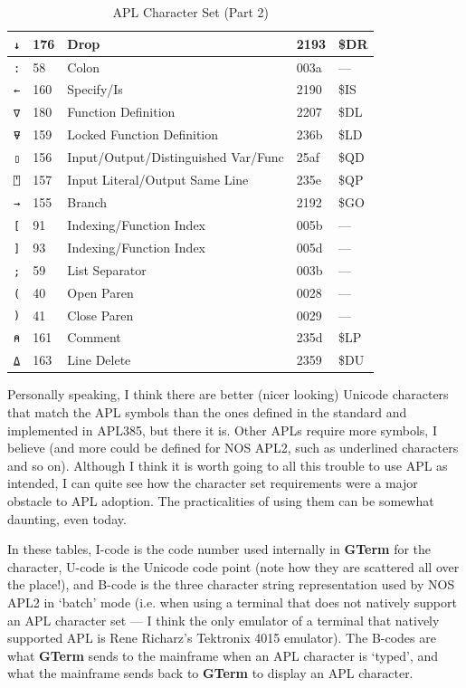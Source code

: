 \documentclass[a4paper,twoside,11pt]{article}
\newcommand{\newpara}{\par\vspace{4mm}\noindent}
\begin{document}
\begin{table}
\begin{tabular}{||l|l|l|l|l||}
\texttt{↓} & 176 & Drop & 2193 & \$DR\\\hline
\texttt{:} & 58 & Colon & 003a & ---\\\hline
\texttt{←} & 160 & Specify/Is & 2190 & \$IS\\\hline
\texttt{∇} & 180 & Function Definition & 2207 & \$DL\\\hline
\texttt{⍫} & 159 & Locked Function Definition & 236b & \$LD\\\hline
\texttt{▯} & 156 & Input/Output/Distinguished Var/Func & 25af & \$QD\\\hline
\texttt{⍞} & 157 & Input Literal/Output Same Line & 235e & \$QP\\\hline
\texttt{→} & 155 & Branch & 2192 & \$GO\\\hline
\texttt{{[}} & 91 & Indexing/Function Index & 005b & ---\\\hline
\texttt{{]}} & 93 & Indexing/Function Index & 005d & ---\\\hline
\texttt{;} & 59 & List Separator & 003b & ---\\\hline
\texttt{(} & 40 & Open Paren & 0028 & ---\\\hline
\texttt{)} & 41 & Close Paren & 0029 & ---\\\hline
\texttt{⍝} & 161 & Comment & 235d & \$LP\\\hline
\texttt{⍙} & 163 & Line Delete & 2359 & \$DU\\\hline
\hline\hline
\end{tabular}
\caption{APL Character Set (Part 2)}
\label{tab:aplcs2}
\end{table}

\newpara
Personally speaking, I think there are better (nicer looking) Unicode characters that match the APL symbols than the
ones defined in the standard and implemented in APL385, but there it is. Other APLs require more symbols, I
believe (and more could be defined for NOS APL2, such as underlined characters and so on). 
Although I think it is worth going to all this trouble to use APL as intended, 
I can quite
see how the character set requirements were 
a major obstacle to APL adoption.
The practicalities of using them can be somewhat daunting, even today.
\newpara
In these tables, I-code is the code number used internally in \textbf{GTerm} for the character,
U-code is the Unicode code point (note how they are scattered all over the place!),
and B-code is the three character string representation used by NOS APL2 in `batch'
mode (i.e. when using a terminal that does not natively support an APL character set ---
I think the only emulator of a terminal that natively supported APL is Rene Richarz's Tektronix 4015 emulator). The
B-codes are what \textbf{GTerm} sends to the mainframe when an APL character is `typed', and what the
mainframe sends back to \textbf{GTerm} to display an APL character. 
\end{document}
